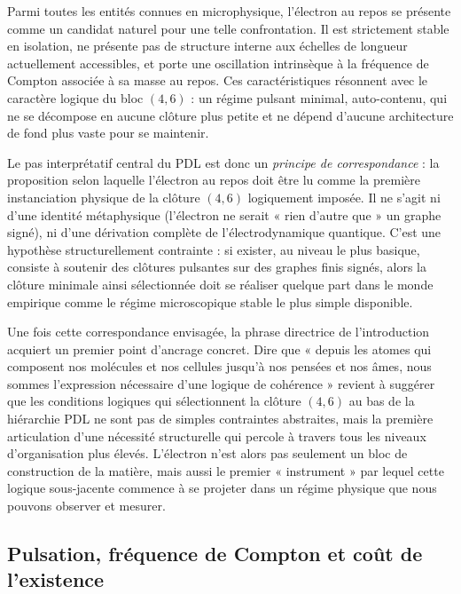 \documentclass[11pt,a4paper]{article}
\theoremstyle{definition}
\begin{document}
Parmi toutes les entités connues en microphysique, l’électron au repos se présente comme un candidat naturel pour une telle confrontation. Il est strictement stable en isolation, ne présente pas de structure interne aux échelles de longueur actuellement accessibles, et porte une oscillation intrinsèque à la fréquence de Compton associée à sa masse au repos.\cite{Laubscher_EmergencePhysicalReality_2024,Laubscher_Existence_PulsatingClosure_2026} Ces caractéristiques résonnent avec le caractère logique du bloc \((4,6)\) : un régime pulsant minimal, auto-contenu, qui ne se décompose en aucune clôture plus petite et ne dépend d’aucune architecture de fond plus vaste pour se maintenir.

Le pas interprétatif central du PDL est donc un \emph{principe de correspondance} : la proposition selon laquelle l’électron au repos doit être lu comme la première instanciation physique de la clôture \((4,6)\) logiquement imposée.\cite{Laubscher_EmergencePhysicalReality_2024,Laubscher_PDL_Position_2024} Il ne s’agit ni d’une identité métaphysique (l’électron ne serait « rien d’autre que » un graphe signé), ni d’une dérivation complète de l’électrodynamique quantique. C’est une hypothèse structurellement contrainte : si exister, au niveau le plus basique, consiste à soutenir des clôtures pulsantes sur des graphes finis signés, alors la clôture minimale ainsi sélectionnée doit se réaliser quelque part dans le monde empirique comme le régime microscopique stable le plus simple disponible.

Une fois cette correspondance envisagée, la phrase directrice de l’introduction acquiert un premier point d’ancrage concret. Dire que « depuis les atomes qui composent nos molécules et nos cellules jusqu’à nos pensées et nos âmes, nous sommes l’expression nécessaire d’une logique de cohérence » revient à suggérer que les conditions logiques qui sélectionnent la clôture \((4,6)\) au bas de la hiérarchie PDL ne sont pas de simples contraintes abstraites, mais la première articulation d’une nécessité structurelle qui percole à travers tous les niveaux d’organisation plus élevés. L’électron n’est alors pas seulement un bloc de construction de la matière, mais aussi le premier « instrument » par lequel cette logique sous-jacente commence à se projeter dans un régime physique que nous pouvons observer et mesurer.\cite{Laubscher_Existence_PulsatingClosure_2026,Laubscher_PDL_GlobalMapping_v6_2024}

\subsection{Pulsation, fréquence de Compton et coût de l'existence}
\end{document}
